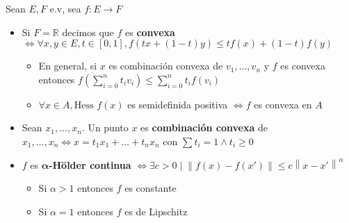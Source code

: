 \documentclass[a4paper,twocolumn]{extarticle}
\newcommand{\R}{\mathbb{R}}
\newcommand{\norma}[1]{\left\lVert#1\right\rVert}
\newcommand{\hess}{\text{Hess }}
\begin{document}
Sean $E,F$ e.v, sea $f: E \to F$
\begin{itemize}
	\item Si $F = \R$ decimos que $f$ es \textbf{convexa} $\iff \forall x,y \in E, t \in [0,1], f(tx + (1-t)y) \leq tf(x) + (1-t)f(y)$
	\begin{itemize}
		\item En general, si $x$ es combinación convexa de $v_1, \dots, v_n$ y $f$ es convexa entonces $f(\sum_{i=0}^n t_i v_i) \leq \sum_{i=0}^nt_if(v_i)$
		\item $\forall x \in A, \hess f (x)$ es semidefinida positiva $\iff f$ es convexa en $A$
	\end{itemize}
	\item Sean $x_1, \dots, x_n$. Un punto $x$ es \textbf{combinación convexa} de $x_1, \dots, x_n \iff x = t_1x_1 + \dots + t_nx_n$ con $\sum t_i = 1 \land t_i \geq 0$
	\item $f$ es $\mathbf{\alpha}$\textbf{-Hölder continua} $\iff \exists c > 0 \mid \norma{f(x) - f(x')} \leq c \norma{x - x'}^\alpha$
	\begin{itemize}
		\item Si $\alpha > 1$ entonces $f$ es constante
		\item Si $\alpha = 1$ entonces $f$ es de Lipschitz
	\end{itemize}
\end{itemize}
\end{document}
